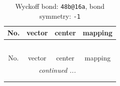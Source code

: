 \documentclass[fleqn,8pt]{jsarticle}
\begin{document}
\renewcommand{\arraystretch}{1.2}
\begin{longtable}{cccc}
\caption{Wyckoff bond: {\tt 48b@16a}, bond symmetry: {\tt -1}}
 \\
 \hline \hline
No. & vector & center & mapping \\ \hline \endfirsthead

\multicolumn{3}{l}{\tablename\ \thetable{}} \\
 \hline \hline
No. & vector & center & mapping \\ \hline \endhead

 \hline \hline
\multicolumn{3}{r}{\footnotesize\it continued ...} \\ \endfoot

 \hline \hline
\multicolumn{3}{r}{} \\ \endlastfoot


\end{longtable}
\end{document}
